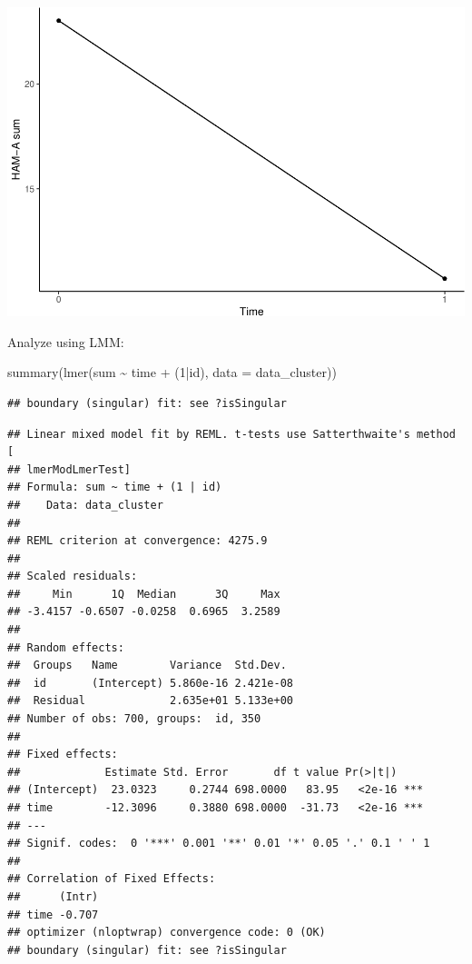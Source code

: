 \documentclass[
]{book}
\newenvironment{Shaded}{\begin{snugshade}}{\end{snugshade}}
\newcommand{\AttributeTok}[1]{\textcolor[rgb]{0.77,0.63,0.00}{#1}}
\newcommand{\DecValTok}[1]{\textcolor[rgb]{0.00,0.00,0.81}{#1}}
\newcommand{\FunctionTok}[1]{\textcolor[rgb]{0.00,0.00,0.00}{#1}}
\newcommand{\NormalTok}[1]{#1}
\newcommand{\SpecialCharTok}[1]{\textcolor[rgb]{0.00,0.00,0.00}{#1}}
\begin{document}
\includegraphics{DZP_R_bookdown_files/figure-latex/unnamed-chunk-10-1.pdf}

Analyze using LMM:

\begin{Shaded}
\begin{Highlighting}[]
\FunctionTok{summary}\NormalTok{(}\FunctionTok{lmer}\NormalTok{(sum }\SpecialCharTok{\textasciitilde{}}\NormalTok{ time }\SpecialCharTok{+}\NormalTok{ (}\DecValTok{1}\SpecialCharTok{|}\NormalTok{id), }\AttributeTok{data =}\NormalTok{ data\_cluster))}
\end{Highlighting}
\end{Shaded}

\begin{verbatim}
## boundary (singular) fit: see ?isSingular
\end{verbatim}

\begin{verbatim}
## Linear mixed model fit by REML. t-tests use Satterthwaite's method [
## lmerModLmerTest]
## Formula: sum ~ time + (1 | id)
##    Data: data_cluster
## 
## REML criterion at convergence: 4275.9
## 
## Scaled residuals: 
##     Min      1Q  Median      3Q     Max 
## -3.4157 -0.6507 -0.0258  0.6965  3.2589 
## 
## Random effects:
##  Groups   Name        Variance  Std.Dev. 
##  id       (Intercept) 5.860e-16 2.421e-08
##  Residual             2.635e+01 5.133e+00
## Number of obs: 700, groups:  id, 350
## 
## Fixed effects:
##             Estimate Std. Error       df t value Pr(>|t|)    
## (Intercept)  23.0323     0.2744 698.0000   83.95   <2e-16 ***
## time        -12.3096     0.3880 698.0000  -31.73   <2e-16 ***
## ---
## Signif. codes:  0 '***' 0.001 '**' 0.01 '*' 0.05 '.' 0.1 ' ' 1
## 
## Correlation of Fixed Effects:
##      (Intr)
## time -0.707
## optimizer (nloptwrap) convergence code: 0 (OK)
## boundary (singular) fit: see ?isSingular
\end{verbatim}
\end{document}
